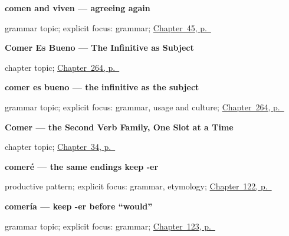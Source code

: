 \noindent\begin{minipage}[t]{\linewidth}
\raggedright
\textbf{comen and viven — agreeing again}\par
\footnotesize grammar topic; explicit focus: grammar; \hyperref[ch:spanish-er-ir-3pl]{Chapter~45, p.~\pageref*{ch:spanish-er-ir-3pl}}
\end{minipage}\par\smallskip

\noindent\begin{minipage}[t]{\linewidth}
\raggedright
\textbf{Comer Es Bueno --- The Infinitive as Subject}\par
\footnotesize chapter topic; \hyperref[ch:comer-es-bueno]{Chapter~264, p.~\pageref*{ch:comer-es-bueno}}
\end{minipage}\par\smallskip

\noindent\begin{minipage}[t]{\linewidth}
\raggedright
\textbf{comer es bueno — the infinitive as the subject}\par
\footnotesize grammar topic; explicit focus: grammar, usage and culture; \hyperref[ch:comer-es-bueno]{Chapter~264, p.~\pageref*{ch:comer-es-bueno}}
\end{minipage}\par\smallskip

\noindent\begin{minipage}[t]{\linewidth}
\raggedright
\textbf{Comer --- the Second Verb Family, One Slot at a Time}\par
\footnotesize chapter topic; \hyperref[ch:spanish-comer]{Chapter~34, p.~\pageref*{ch:spanish-comer}}
\end{minipage}\par\smallskip

\noindent\begin{minipage}[t]{\linewidth}
\raggedright
\textbf{comeré — the same endings keep -er}\par
\footnotesize productive pattern; explicit focus: grammar, etymology; \hyperref[ch:spanish-futuro]{Chapter~122, p.~\pageref*{ch:spanish-futuro}}
\end{minipage}\par\smallskip

\noindent\begin{minipage}[t]{\linewidth}
\raggedright
\textbf{comería — keep -er before “would”}\par
\footnotesize grammar topic; explicit focus: grammar; \hyperref[ch:spanish-condicional]{Chapter~123, p.~\pageref*{ch:spanish-condicional}}
\end{minipage}\par\smallskip

